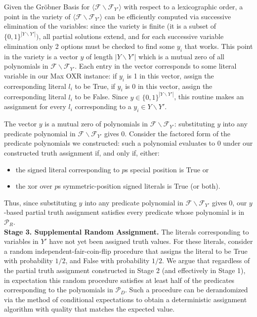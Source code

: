 \documentclass{article}
\begin{document}
Given the Gr\"{o}bner Basis for $\langle\mathcal{F}\backslash \mathcal{F}_{Y'}\rangle$ with respect to a lexicographic order, a point in the variety of $\langle\mathcal{F}\backslash \mathcal{F}_{Y'}\rangle$ can be efficiently computed via successive elimination of the variables: since the variety is finite (it is a subset of $\{0,1\}^{|Y\backslash Y'|})$, all partial solutions extend, and for each successive variable elimination only 2 options must be checked to find some $y_i$ that works. This point in the variety is a vector $y$ of length $|Y\backslash Y'|$ which is a mutual zero of all polynomials in $\mathcal{F}\backslash \mathcal{F}_{Y'}$. Each entry in the vector corresponds to some literal variable in our Max OXR instance:
if $y_i$ is 1 in this vector, assign the corresponding literal $l_i$ to be True, if $y_i$ is 0 in this vector, assign the corresponding literal $l_i$ to be False. Since $y\in \{0,1\}^{|Y\backslash Y'|}$, this routine makes an assignment for every $l_i$ corresponding to a  $y_i \in Y\backslash Y'$. 

The vector $y$ is a mutual zero of polynomials in $\mathcal{F}\backslash \mathcal{F}_{Y'}$: substituting $y$ into any predicate polynomial
in $\mathcal{F}\backslash \mathcal{F}_{Y'}$ gives 0. Consider the factored form of the predicate polynomials we constructed: such a polynomial evaluates to 0 under our constructed truth assignment if, and only if, either:
\begin{itemize}
\item 
the signed literal corresponding to $p$s special position is True or 
\item the xor over $p$s symmetric-position signed literals is True (or both). 
\end{itemize}
Thus, since substituting $y$ into any predicate polynomial
in $\mathcal{F}\backslash \mathcal{F}_{Y'}$ gives 0, our $y$-based partial truth assignment satisfies every predicate whose polynomial is in $\mathcal{P}_R$.\\

\noindent \textbf{Stage 3. Supplemental Random Assignment.} The literals corresponding to variables in $Y'$ have not yet been assigned truth values. For these literals, consider a random independent-fair-coin-flip procedure that assigns the literal to be True with probability $1/2$, and False with probability $1/2$. We argue that regardless of the partial truth assignment constructed in Stage 2 (and effectively in Stage 1), in expectation this random procedure satisfies at least half of the predicates corresponding to the polynomials in $\mathcal{P}_D$. Such a procedure can be derandomized via the method of conditional expectations to obtain a deterministic assignment algorithm with quality that matches the expected value.
\end{document}
